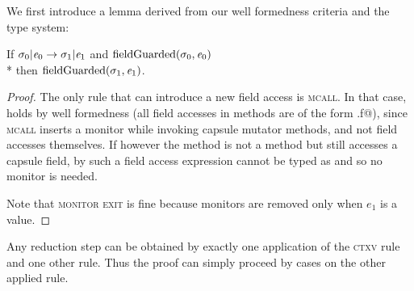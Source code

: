 We first introduce a lemma derived from our well formedness criteria and the type system:
\begin{Lemma}\rm
If $\sigma_0 | {\mathit{e}}_0\rightarrow \sigma_1 |{\mathit{e}}_1$ and
$\text{fieldGuarded}(\sigma_0,{\mathit{e}}_0)$
\\*
then $\text{fieldGuarded}(\sigma_1,{\mathit{e}}_1)$.
\end{Lemma}
\begin{proof}
The only rule that can
introduce a new field access is \textsc{mcall}.
In that case,  holds
by well formedness (all field accesses in methods are of the form \Q@this.f@),
since \textsc{mcall} inserts a monitor while invoking capsule mutator methods, and not field accesses themselves. If however the method is not a \Q@mut@ method but still accesses a capsule field, by  such a field access expression cannot be typed as \Q@mut@ and so no monitor is needed.

Note that \textsc{monitor exit} is fine because monitors are removed only when
 $e_1$ is a value.
\end{proof}

Any reduction step can be obtained
by exactly one application of the \textsc{ctxv} rule and one other rule. Thus the proof can simply proceed by cases on the other applied rule.

